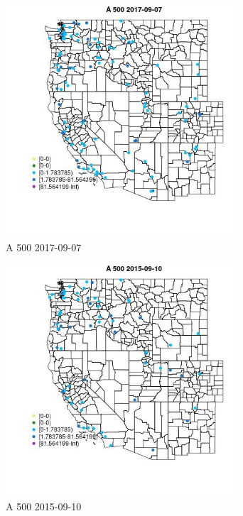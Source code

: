 \begin{figure} 
\centering  
\includegraphics[width=0.77\textwidth]{Code_Outputs/Report_ML_input_PM25_Step4_part_e_de_duplicated_aveswNAs_MapObsA_5002017-09-07.jpg} 
\caption{\label{fig:Report_ML_input_PM25_Step4_part_e_de_duplicated_aveswNAsMapObsA_5002017-09-07}A 500 2017-09-07} 
\end{figure} 
 

\begin{figure} 
\centering  
\includegraphics[width=0.77\textwidth]{Code_Outputs/Report_ML_input_PM25_Step4_part_e_de_duplicated_aveswNAs_MapObsA_5002015-09-10.jpg} 
\caption{\label{fig:Report_ML_input_PM25_Step4_part_e_de_duplicated_aveswNAsMapObsA_5002015-09-10}A 500 2015-09-10} 
\end{figure} 
 

